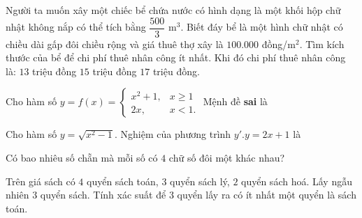	\begin{ex} %
	Người ta muốn xây một chiếc bể chứa nước có hình dạng là một khối hộp chữ nhật không nắp có thể tích bằng $\dfrac{500}{3}$ m$^3$. Biết đáy bể là một hình chữ nhật có chiều dài gấp đôi chiều rộng và giá thuê thợ xây là $100.000$ đồng/m$^2$. Tìm kích thước của bể để chi phí thuê nhân công ít nhất. Khi đó chi phí thuê nhân công là:
		 {$13$ triệu đồng} {\True $15$ triệu đồng} {$17$ triệu đồng}.
	\end{ex}
	\begin{ex}%
Cho hàm số $y=f(x)=\begin{cases}x^2+1,&x\geq 1\\2x,&x<1.\end{cases}$ Mệnh đề \textbf{sai} là
\end{ex}
\begin{ex}%
Cho hàm số $y=\sqrt{x^2-1}$. Nghiệm của phương trình $y'.y=2x+1$ là
\end{ex}
\begin{ex}%
Có bao nhiêu số chẵn mà mỗi số có $4$ chữ số đôi một khác nhau?
\end{ex}
\begin{ex}%
Trên giá sách có $4$ quyển sách toán, $3$ quyển sách lý, $2$ quyển sách hoá. Lấy ngẫu nhiên $3$ quyển sách. Tính xác suất để $3$ quyển lấy ra có ít nhất một quyển là sách toán.
\end{ex}

